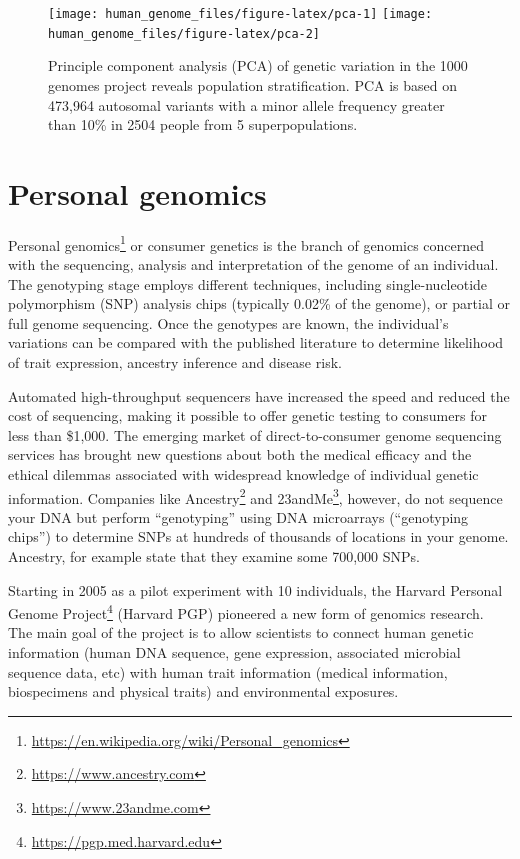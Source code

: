 \documentclass[]{book}
\let\rmarkdownfootnote\footnote%
\def\footnote{\protect\rmarkdownfootnote}
\renewcommand{\href}[2]{#2\footnote{\url{#1}}}
\begin{document}
\begin{figure}

{\centering \texttt{[image: human\_genome\_files/figure-latex/pca-1]} \texttt{[image: human\_genome\_files/figure-latex/pca-2]} 

}

\caption{Principle component analysis (PCA) of genetic variation in the 1000 genomes project reveals population stratification. PCA is based on 473,964 autosomal variants with a minor allele frequency greater than 10\% in 2504 people from 5 superpopulations.}\label{fig:pca}
\end{figure}

\hypertarget{personal-genomics}{%
\section{Personal genomics}\label{personal-genomics}}

\href{https://en.wikipedia.org/wiki/Personal_genomics}{Personal genomics} or consumer genetics is the branch of genomics concerned with the sequencing, analysis and interpretation of the genome of an individual. The genotyping stage employs different techniques, including single-nucleotide polymorphism (SNP) analysis chips (typically 0.02\% of the genome), or partial or full genome sequencing. Once the genotypes are known, the individual's variations can be compared with the published literature to determine likelihood of trait expression, ancestry inference and disease risk.

Automated high-throughput sequencers have increased the speed and reduced the cost of sequencing, making it possible to offer genetic testing to consumers for less than \$1,000. The emerging market of direct-to-consumer genome sequencing services has brought new questions about both the medical efficacy and the ethical dilemmas associated with widespread knowledge of individual genetic information. Companies like \href{https://www.ancestry.com}{Ancestry} and \href{https://www.23andme.com}{23andMe}, however, do not sequence your DNA but perform ``genotyping'' using DNA microarrays (``genotyping chips'') to determine SNPs at hundreds of thousands of locations in your genome. Ancestry, for example state that they examine some 700,000 SNPs.

Starting in 2005 as a pilot experiment with 10 individuals, the \href{https://pgp.med.harvard.edu}{Harvard Personal Genome Project} (Harvard PGP) pioneered a new form of genomics research. The main goal of the project is to allow scientists to connect human genetic information (human DNA sequence, gene expression, associated microbial sequence data, etc) with human trait information (medical information, biospecimens and physical traits) and environmental exposures.
\end{document}

